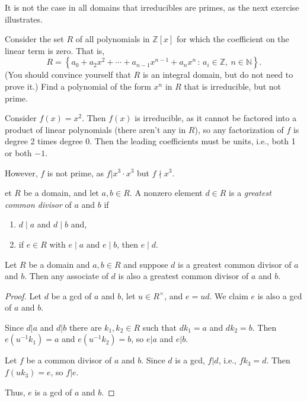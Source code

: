 \documentclass[english,course]{lecture}
\newenvironment{solution}[1][Solution]{\begin{trivlist}\pushQED{\qed}\item[\hskip \labelsep  \bfseries #1{}.\hspace{10pt}]}{\popQED\end{trivlist}}\renewcommand{\qedsymbol}{$\checkmark$}{\newenvironment{answer}{\renewcommand\qedsymbol{$\blacklozenge$}\begin{proof}[Answer]}{\end{proof}}}\newenvironment{answer}[1][Answer]{\begin{trivlist}\pushQED{\qed}\item[\hskip \labelsep  \bfseries #1{}.\hspace{10pt}]}{\popQED\end{trivlist}}\renewcommand{\qedsymbol}{$\lozenge$}
\theoremstyle{plain}
\newenvironment{definition}[1]
  {\renewcommand\theinnerdefinition{#1}\innerdefinition}
  {\endinnerdefinition}
\def\setof#1#2{{\left\{#1\,\colon\,#2\right\}}}
\def\Z{{\mathbb Z}}
\def\N{{\mathbb N}}
\def\presnotes{}
\begin{document}
\presnotes

It is not the case in all domains that irreducibles are primes, as the next exercise illustrates.


\begin{exer}\label{exer:irreduciblenotprime}%
	Consider the set $R$ of all polynomials in $\Z[x]$ for which the coefficient on the linear term is zero.	
	That is,
	\[
		R = \setof{a_0 + a_2 x^2 + \cdots + a_{n-1} x^{n-1} + a_n x^n}{a_i\in \Z,\ n\in\N}.
	\]
	(You should convince yourself that $R$ is an integral domain, but do not need to prove it.)
	Find a polynomial of the form $x^n$ in $R$ that is irreducible, but not prime.
\end{exer}

\begin{solution}
	Consider $f(x) = x^2$.
	Then $f(x)$ is irreducible, as it cannot be factored into a product of linear polynomials (there aren't any in $R$), so any factorization of $f$ is degree 2 times degree 0. Then the leading coefficients must be units, i.e., both 1 or both $-1$. 
	
	However, $f$ is not prime, as $f| x^3 \cdot x^3$ but $f\nmid x^3$.
\end{solution}

\presnotes

\begin{definition}
	Let $R$ be a domain, and let $a,b\in R$.
	A nonzero element $d\in R$ is a \emph{greatest common divisor} of $a$ and $b$ if
	\begin{enumerate}
		\item $d\mid a$ and $d\mid b$ and,
		\item if $e\in R$ with $e\mid a$ and $e\mid b$, then $e\mid d$.
	\end{enumerate}
\end{definition}




\begin{theorem}
	Let $R$ be a domain and $a,b\in R$ and suppose $d$ is a greatest common divisor of $a$ and $b$.
	Then any associate of $d$ is also a greatest common divisor of $a$ and $b$.
\end{theorem}

\begin{proof}
	Let $d$ be a gcd of $a$ and $b$, let $u\in R^\times$, and $e =ud$.
	We claim $e$ is also a gcd of $a$ and $b$.
	
	Since $d|a$ and $d|b$ there are $k_1,k_2\in R$ such that $d k_1 = a$ and $d k_2 = b$.
	Then $e (u^{-1} k_1) = a$ and $e (u^{-1} k_2) = b$, so $e|a$ and $e|b$.
	
	Let $f$ be a common divisor of $a$ and $b$. Since $d$ is a gcd, $f|d$, i.e., $f k_3 = d$.
	Then $f (uk_3) = e$, so $f|e$.
	
	Thus, $e$ is a gcd of $a$ and $b$.
\end{proof}
\end{document}
